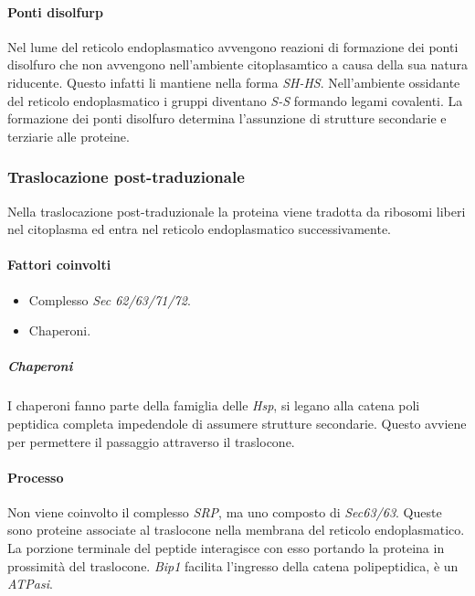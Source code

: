			\paragraph{Ponti disolfurp}
			Nel lume del reticolo endoplasmatico avvengono reazioni di formazione dei ponti disolfuro che non avvengono nell'ambiente citoplasamtico a causa della sua natura riducente.
			Questo infatti li mantiene nella forma \emph{SH-HS}.
			Nell'ambiente ossidante del reticolo endoplasmatico i gruppi diventano \emph{S-S} formando legami covalenti.
			La formazione dei ponti disolfuro determina l'assunzione di strutture secondarie e terziarie alle proteine.

		\subsubsection{Traslocazione post-traduzionale}
		Nella traslocazione post-traduzionale la proteina viene tradotta da ribosomi liberi nel citoplasma ed entra nel reticolo endoplasmatico successivamente.
		
			\paragraph{Fattori coinvolti}
			\begin{multicols}{2}
				\begin{itemize}
					\item Complesso \emph{Sec 62/63/71/72}.
					\item Chaperoni.
				\end{itemize}
			\end{multicols}

				\subparagraph{Chaperoni}
				I chaperoni fanno parte della famiglia delle \emph{Hsp}, si legano alla catena poli peptidica completa impedendole di assumere strutture secondarie.
				Questo avviene per permettere il passaggio attraverso il traslocone.

			\paragraph{Processo}
			Non viene coinvolto il complesso \emph{SRP}, ma uno composto di \emph{Sec63/63}.
			Queste sono proteine associate al traslocone nella membrana del reticolo endoplasmatico.
			La porzione terminale del peptide interagisce con esso portando la proteina in prossimit\`a del traslocone.
			\emph{Bip1} facilita l'ingresso della catena polipeptidica, \`e un \emph{ATPasi}.

